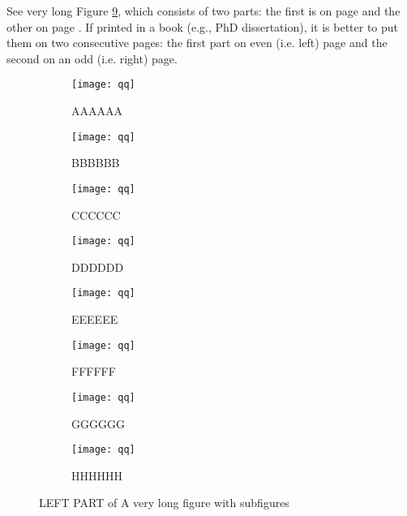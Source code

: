 \documentclass[12pt,a4paper,twoside]{book}
\newenvironment{mysubfig}
{\begin{subfigure}{0.5\linewidth}\centering}
{\end{subfigure}}
\begin{document}
See very long Figure \ref{fig:long}, which consists of two parts:
the first is on page \pageref{fig:A} and the other on page \pageref{fig:I}.
If printed in a book (e.g., PhD dissertation), it is better to put them 
on two consecutive pages: the first part on even (i.e. left) page
and the second on an odd (i.e. right) page.

\begin{figure}
 \begin{leftfullpage}
  \begin{mysubfig} %
     \texttt{[image: qq]}
     \caption{AAAAAA}\label{fig:A}
  \end{mysubfig} 
  \begin{mysubfig}   %
     \texttt{[image: qq]}
     \caption{BBBBBB}\label{fig:B}
  \end{mysubfig} 
  \begin{mysubfig}   %
     \texttt{[image: qq]}
     \caption{CCCCCC}\label{fig:C}
  \end{mysubfig} 
  \begin{mysubfig}   %
     \texttt{[image: qq]}
     \caption{DDDDDD}\label{fig:D}
  \end{mysubfig} 
  \begin{mysubfig}   %
     \texttt{[image: qq]}
     \caption{EEEEEE}\label{fig:E}
  \end{mysubfig} 
  \begin{mysubfig}   %
     \texttt{[image: qq]}
     \caption{FFFFFF}\label{fig:F}
  \end{mysubfig} 
  \begin{mysubfig}   %
     \texttt{[image: qq]}
     \caption{GGGGGG}\label{fig:G}
  \end{mysubfig} 
  \begin{mysubfig}   %
     \texttt{[image: qq]}
     \caption{HHHHHH}\label{fig:H}
  \end{mysubfig} 
  \caption{LEFT PART of A very long figure with subfigures}\label{fig:long}
 \end{leftfullpage}
\end{figure}

\end{document}

